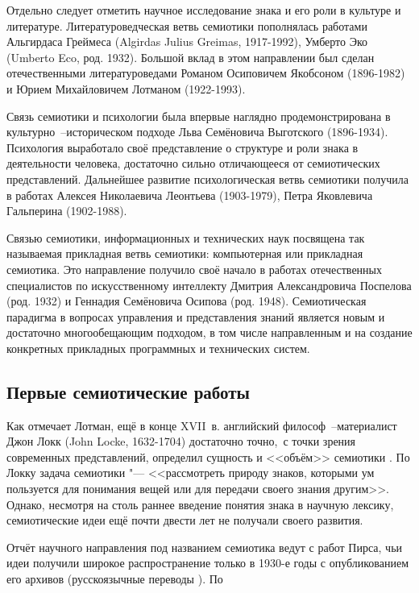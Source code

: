 \documentclass[a4paper,12pt]{article}
\begin{document}
	Отдельно следует отметить научное исследование знака и его роли в культуре и литературе. Литературоведческая ветвь семиотики пополнялась работами Альгирдаса Греймеса (Algirdas Julius Greimas, 1917-1992), Умберто Эко (Umberto Eco, род. 1932). Большой вклад в этом направлении был сделан отечественными литературоведами Романом Осиповичем Якобсоном (1896-1982) и Юрием Михайловичем Лотманом (1922-1993).
	
	Связь семиотики и психологии была впервые наглядно продемонстрирована в культурно~--историческом подходе Льва Семёновича Выготского (1896-1934). Психология выработало своё представление о структуре и роли знака в деятельности человека, достаточно сильно отличающееся от семиотических представлений. Дальнейшее развитие психологическая ветвь семиотики получила в работах Алексея Николаевича Леонтьева (1903-1979), Петра Яковлевича Гальперина (1902-1988).
	
	Связью семиотики, информационных и технических наук посвящена так называемая прикладная ветвь семиотики: компьютерная или прикладная семиотика. Это направление получило своё начало в работах отечественных специалистов по искусственному интеллекту Дмитрия Александровича Поспелова (род. 1932) и Геннадия Семёновича Осипова (род. 1948). Семиотическая парадигма в вопросах управления и представления знаний является новым и достаточно многообещающим подходом, в том числе направленным и на создание конкретных прикладных программных и технических систем.
	
	\subsection{Первые семиотические работы}
	
	Как отмечает Лотман, ещё в конце XVII~в. английский философ~--материалист Джон Локк (John Locke, 1632-1704) достаточно точно,~с точки зрения современных представлений, определил сущность и <<объём>> семиотики \cite[8]{Lotman2000}. По Локку задача семиотики "--- <<рассмотреть природу знаков, которыми ум пользуется для понимания вещей или для передачи своего знания другим>>. Однако, несмотря на столь раннее введение понятия знака в научную лексику, семиотические идеи ещё почти двести лет не получали своего развития.
	
	Отчёт научного направления под названием семиотика ведут с работ Пирса, чьи идеи получили широкое распространение только в 1930-е годы с опубликованием его архивов (русскоязычные переводы \cite{Pierce2000a,Pierce2000b, Pierce2009}). По
	
\end{document}
